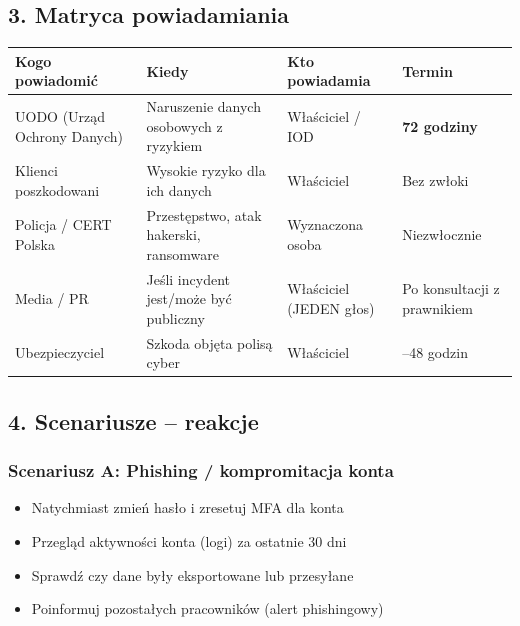 \documentclass[12pt,a4paper]{article}
\providecommand{\tightlist}{\setlength{\itemsep}{0pt}\setlength{\parskip}{0pt}}
\begin{document}
\subsection{3. Matryca powiadamiania}\label{matryca-powiadamiania}

\begin{longtable}[]{@{}>{\raggedright\arraybackslash}p{}>{\raggedright\arraybackslash}p{}>{\raggedright\arraybackslash}p{}>{\raggedright\arraybackslash}p{}@{}}
\toprule\noalign{}
Kogo powiadomić & Kiedy & Kto powiadamia & Termin \\
\midrule\noalign{}
\endhead
\bottomrule\noalign{}
\endlastfoot
UODO (Urząd Ochrony Danych) & Naruszenie danych osobowych z ryzykiem &
Właściciel / IOD & \textbf{72 godziny} \\
Klienci poszkodowani & Wysokie ryzyko dla ich danych & Właściciel & Bez
zwłoki \\
Policja / CERT Polska & Przestępstwo, atak hakerski, ransomware &
Wyznaczona osoba & Niezwłocznie \\
Media / PR & Jeśli incydent jest/może być publiczny & Właściciel (JEDEN
głos) & Po konsultacji z prawnikiem \\
Ubezpieczyciel & Szkoda objęta polisą cyber & Właściciel & 24--48
godzin \\
\end{longtable}

\subsection{4. Scenariusze -- reakcje}\label{scenariusze-reakcje}

\subsubsection{Scenariusz A: Phishing / kompromitacja
konta}\label{scenariusz-a-phishing-kompromitacja-konta}

\begin{itemize}
\tightlist
\item
  Natychmiast zmień hasło i zresetuj MFA dla konta
\item
  Przegląd aktywności konta (logi) za ostatnie 30 dni
\item
  Sprawdź czy dane były eksportowane lub przesyłane
\item
  Poinformuj pozostałych pracowników (alert phishingowy)
\end{itemize}
\end{document}
